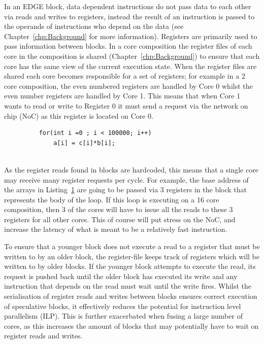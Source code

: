 In an EDGE block, data dependent instructions do not pass data to each other via reads and writes to registers, instead the result of an instruction is passed to the operands of instructions who depend on the data (see Chapter~\ref{chp:Background} for more information).
Registers are primarily used to pass information between blocks.
In a core composition the register files of each core in the composition is shared (Chapter~\ref{chp:Background}) to ensure that each core has the same view of the current execution state.
When the register files are shared each core becomes responsible for a set of registers; for example in a 2 core composition, the even numbered registers are handled by Core 0 whilst the even number registers are handled by Core 1.
This means that when Core 1 wants to read or write to Register 0 it must send a request via the network on chip (NoC) as this register is located on Core 0.

\begin{figure}[t]
\lstset{language=C,numbersep=4pt}
\begin{center}
\begin{lstlisting}
	for(int i =0 ; i < 100000; i++)
		a[i] = c[i]*b[i];
	
\end{lstlisting}
\end{center}
\vspace{-1em}
\label{lst:basic2}
\end{figure}

As the register reads found in blocks are hardcoded, this means that a single core may receive many register requests per cycle.
For example, the base address of the arrays in Listing~\ref{lst:basic2} are going to be passed via 3 registers in the block that represents the body of the loop.
If this loop is executing on a 16 core composition, then 3 of the cores will have to issue all the reads to these 3 registers for all other cores.
This of course will put stress on the NoC, and increase the latency of what is meant to be a relatively fast instruction.

To ensure that a younger block does not execute a read to a register that must be written to by an older block, the register-file keeps track of registers which will be written to by older blocks.
If the younger block attempts to execute the read, its request is pushed back until the older block has executed its write and any instruction that depends on the read must wait until the write fires.
Whilst the serialisation of register reads and writes between blocks ensures correct execution of speculative blocks, it effectively reduces the potential for instruction level parallelism (ILP).
This is further exacerbated when fusing a large number of cores, as this increases the amount of blocks that may potentially have to wait on register reads and writes.

